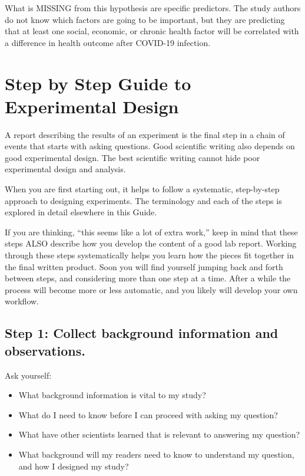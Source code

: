 \documentclass[
]{book}
\providecommand{\tightlist}{%
  \setlength{\itemsep}{0pt}\setlength{\parskip}{0pt}}
\begin{document}
What is MISSING from this hypothesis are specific predictors. The study authors do not know which factors are going to be important, but they are predicting that at least one social, economic, or chronic health factor will be correlated with a difference in health outcome after COVID-19 infection.

\hypertarget{expdesign210}{%
\chapter{Step by Step Guide to Experimental Design}\label{expdesign210}}

A report describing the results of an experiment is the final step in a chain of events that starts with asking questions. Good scientific writing also depends on good experimental design. The best scientific writing cannot hide poor experimental design and analysis.

When you are first starting out, it helps to follow a systematic, step-by-step approach to designing experiments. The terminology and each of the steps is explored in detail elsewhere in this Guide.

If you are thinking, ``this seems like a lot of extra work,'' keep in mind that these steps ALSO describe how you develop the content of a good lab report. Working through these steps systematically helps you learn how the pieces fit together in the final written product. Soon you will find yourself jumping back and forth between steps, and considering more than one step at a time. After a while the process will become more or less automatic, and you likely will develop your own workflow.

\hypertarget{step-1-collect-background-information-and-observations.}{%
\section*{Step 1: Collect background information and observations.}\label{step-1-collect-background-information-and-observations.}}

Ask yourself:

\begin{itemize}
\tightlist
\item
  What background information is vital to my study?
\item
  What do I need to know before I can proceed with asking my question?
\item
  What have other scientists learned that is relevant to answering my question?
\item
  What background will my readers need to know to understand my question, and how I designed my study?
\end{itemize}
\end{document}
